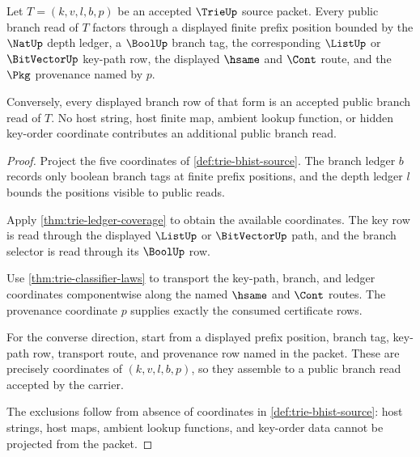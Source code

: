 \begin{theorem}\label{thm:trie-branch-read-exactness}
Let $T=(k,v,l,b,p)$ be an accepted $\TrieUp$ source packet. Every public
branch read of $T$ factors through a displayed finite prefix position bounded
by the $\NatUp$ depth ledger, a $\BoolUp$ branch tag, the corresponding
$\ListUp$ or $\BitVectorUp$ key-path row, the displayed $\hsame$ and $\Cont$
route, and the $\Pkg$ provenance named by $p$.

Conversely, every displayed branch row of that form is an accepted public
branch read of $T$. No host string, host finite map, ambient lookup function,
or hidden key-order coordinate contributes an additional public branch read.
\end{theorem}
\begin{proof}
Project the five coordinates of \autoref{def:trie-bhist-source}. The branch
ledger $b$ records only boolean branch tags at finite prefix positions, and the
depth ledger $l$ bounds the positions visible to public reads.

Apply \autoref{thm:trie-ledger-coverage} to obtain the available coordinates.
The key row is read through the displayed $\ListUp$ or $\BitVectorUp$ path, and
the branch selector is read through its $\BoolUp$ row.

Use \autoref{thm:trie-classifier-laws} to transport the key-path, branch, and
ledger coordinates componentwise along the named $\hsame$ and $\Cont$ routes.
The provenance coordinate $p$ supplies exactly the consumed certificate rows.

For the converse direction, start from a displayed prefix position, branch tag,
key-path row, transport route, and provenance row named in the packet. These
are precisely coordinates of $(k,v,l,b,p)$, so they assemble to a public branch
read accepted by the carrier.

The exclusions follow from absence of coordinates in
\autoref{def:trie-bhist-source}: host strings, host maps, ambient lookup
functions, and key-order data cannot be projected from the packet.
\end{proof}

